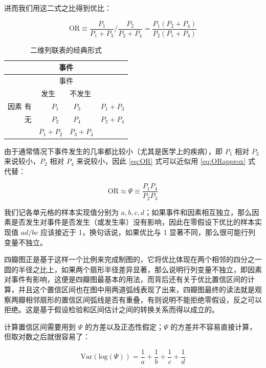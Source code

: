 \documentclass[
  b5paper,
  UTF8,twoside]{book}
\begin{document}
进而我们用这二式之比得到优比：

\begin{equation} 
\mathrm{OR}\equiv\frac{P_{1}}{P_{1}+P_{3}}/\frac{P_{2}}{P_{2}+P_{4}}=\frac{P_{1}(P_{2}+P_{4})}{P_{2}(P_{1}+P_{3})}
\label{eq:OR}
\end{equation}

\begin{longtable}[]{@{}rcl@{}}
\caption{\label{tab:contingency} 二维列联表的经典形式}\tabularnewline
\toprule
& 事件 & \\
\midrule
\endfirsthead
\toprule
& 事件 & \\
\midrule
\endhead
& 发生　　不发生 & \\
因素 有 & \(P_{1}\)　　\(P_{3}\) & \(P_{1}+P_{3}\) \\
无 & \(P_{2}\)　　\(P_{4}\) & \(P_{2}+P_{4}\) \\
& \(P_{1}+P_{2}\)　\(P_{3}+P_{4}\) & \\
\bottomrule
\end{longtable}

由于通常情况下事件发生的几率都比较小（尤其是医学上的疾病），即 \(P_{1}\) 相对 \(P_{3}\) 来说较小，\(P_{2}\) 相对 \(P_{4}\) 来说较小，因此 \eqref{eq:OR} 式可以近似用 \eqref{eq:ORapprox} 式代替：

\begin{equation} 
\mathrm{OR}\approx\Psi\equiv\frac{P_{1}P_{4}}{P_{2}P_{3}}
\label{eq:ORapprox}
\end{equation}

我们记各单元格的样本实现值分别为 \(a,b,c,d\)；如果事件和因素相互独立，那么因素是否发生对事件是否发生（或发生率）没有影响，因此在零假设下优比的样本实现值 \(ad/bc\) 应该接近于 1，换句话说，如果优比与 1 显著不同，那么很可能行列变量不独立。

四瓣图正是基于这样一个比例来完成制图的，它将优比体现在两个相邻的四分之一圆的半径之比上，如果两个扇形半径差异显著，那么说明行列变量不独立，即因素对事件有影响，这便是四瓣图最基本的用法，而背后还有关于优比置信区间的计算，并且这个置信区间也在图中用两道弧线表现了出来，四瓣图最终的读法就是观察两瓣相邻扇形的置信区间弧线是否有重叠，有则说明不能拒绝零假设，反之可以拒绝。这是基于假设检验和区间估计之间的转换关系而得以成立的。

计算置信区间需要用到 \(\Psi\) 的方差以及正态性假定；\(\Psi\) 的方差并不容易直接计算，但取对数之后就很容易了：

\begin{equation}
\mathrm{Var}(\mathrm{log}(\Psi))=\frac{1}{a}+\frac{1}{b}+\frac{1}{c}+\frac{1}{d}
\label{eq:ORlog}
\end{equation}
\end{document}
